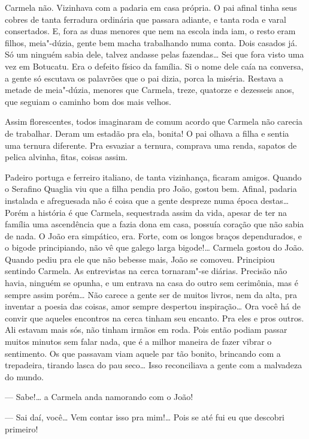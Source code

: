 Carmela não. Vizinhava com a padaria em casa própria. O pai afinal tinha
seus cobres de tanta ferradura ordinária que passara adiante, e tanta
roda e varal consertados. E, fora as duas menores que nem na escola inda
iam, o resto eram filhos, meia"-dúzia, gente bem macha trabalhando numa
conta. Dois casados já. Só um ninguém sabia dele, talvez andasse pelas
fazendas\ldots{} Sei que fora visto uma vez em Botucatu. Era o defeito físico
da família. Si o nome dele caía na conversa, a gente só escutava os
palavrões que o pai dizia, porca la miséria. Restava a metade de
meia"-dúzia, menores que Carmela, treze, quatorze e dezesseis anos, que
seguiam o caminho bom dos mais velhos.

Assim florescentes, todos imaginaram de comum acordo que Carmela não
carecia de trabalhar. Deram um estadão pra ela, bonita! O pai olhava a
filha e sentia uma ternura diferente. Pra esvaziar a ternura, comprava
uma renda, sapatos de pelica alvinha, fitas, coisas assim.

Padeiro portuga e ferreiro italiano, de tanta vizinhança, ficaram
amigos. Quando o Serafino Quaglia viu que a filha pendia pro João,
gostou bem. Afinal, padaria instalada e afreguesada não é coisa que a
gente despreze numa época destas\ldots{} Porém a história é que Carmela,
sequestrada assim da vida, apesar de ter na família uma ascendência que
a fazia dona em casa, possuía coração que não sabia de nada. O João era
simpático, era. Forte, com os longos braços dependurados, e o bigode
principiando, não vê que galego larga bigode!\ldots{} Carmela gostou do João.
Quando pediu pra ele que não bebesse mais, João se comoveu. Principiou
sentindo Carmela. As entrevistas na cerca tornaram"-se diárias. Precisão
não havia, ninguém se opunha, e um entrava na casa do outro sem
cerimônia, mas é sempre assim porém\ldots{} Não carece a gente ser de muitos
livros, nem da alta, pra inventar a poesia das coisas, amor sempre
despertou inspiração\ldots{} Ora você há de convir que aqueles encontros na
cerca tinham seu encanto. Pra eles e pros outros. Ali estavam mais sós,
não tinham irmãos em roda. Pois então podiam passar muitos minutos sem
falar nada, que é a milhor maneira de fazer vibrar o sentimento. Os que
passavam viam aquele par tão bonito, brincando com a trepadeira, tirando
lasca do pau seco\ldots{} Isso reconciliava a gente com a malvadeza do mundo.

--- Sabe!\ldots{} a Carmela anda namorando com o João!

--- Sai daí, você\ldots{} Vem contar isso pra mim!\ldots{} Pois se até fui eu que
descobri primeiro! 

